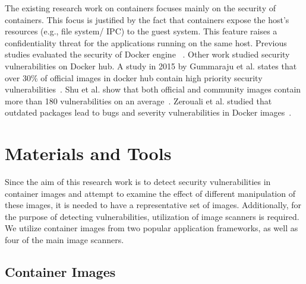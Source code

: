 \documentclass[a4paper,num-refs]{oup-contemporary}
\begin{document}

The existing research work on containers focuses mainly on the security of containers.
This focus is justified by the fact that containers expose the host's resources
(e.g., file system/ IPC) to the guest system. This feature raises a confidentiality
threat for the applications running on the same host. Previous studies evaluated
the security of Docker engine ~\cite{martin2018docker, sultan2019container, combe2016docker, bui2015analysis}.
Other work studied security vulnerabilities on Docker hub. A study in 2015 by Gummaraju et al.
states that over 30\% of official images in docker hub contain high priority 
security vulnerabilities~\cite{gummaraju2015over}. Shu et al. show that both official and community images 
contain more than 180 vulnerabilities on an average~\cite{Shu2017}.
Zerouali et al. studied that 
outdated packages lead to bugs and severity vulnerabilities in Docker
images~\cite{zerouali2019relation}.


\section{Materials and Tools}

Since the aim of this research work is to detect security vulnerabilities
in container images and attempt to examine the effect of different
manipulation of these images, it is needed to have a representative set of
images. Additionally, for the purpose of detecting vulnerabilities,
utilization of image scanners is required. We utilize container
images from two popular application frameworks, as well as
four of the main image scanners.

\subsection{Container Images}
\end{document}
